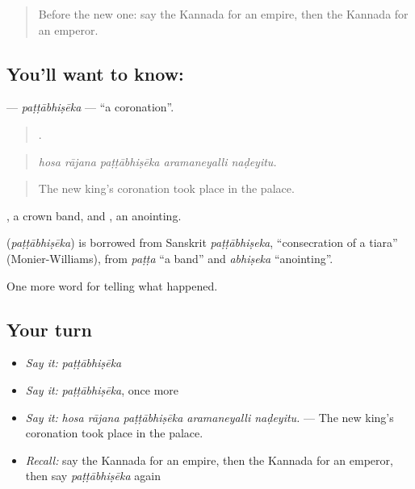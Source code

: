 \label{lesson:KA-C354-pattabhiseka}



\begin{quote}
Before the new one: say the Kannada for an empire, then the Kannada for an emperor.
\end{quote}

\subsection*{You'll want to know: }
\textbf{} — \emph{paṭṭābhiṣēka} — \textquotedblleft{}a coronation\textquotedblright{}.

\begin{quote}
    .
\end{quote}

\begin{quote}
\emph{hosa rājana paṭṭābhiṣēka aramaneyalli naḍeyitu.}
\end{quote}

\begin{quote}
The new king's coronation took place in the palace.
\end{quote}

, a crown band, and , an anointing.

\begin{cousinweb}
\textbf{} (\emph{paṭṭābhiṣēka}) is borrowed from Sanskrit \emph{paṭṭābhiṣeka}, \textquotedblleft{}consecration of a tiara\textquotedblright{} (Monier-Williams), from \emph{paṭṭa} \textquotedblleft{}a band\textquotedblright{} and \emph{abhiṣeka} \textquotedblleft{}anointing\textquotedblright{}.
\end{cousinweb}

\begin{grammarlens}[title={What you've built}]
One more word for telling what happened.
\end{grammarlens}

\subsection*{Your turn}
\begin{itemize}
\raggedright
  \item \emph{Say it:} \emph{paṭṭābhiṣēka}
  \item \emph{Say it:} \emph{paṭṭābhiṣēka}, once more
  \item \emph{Say it:} \emph{hosa rājana paṭṭābhiṣēka aramaneyalli naḍeyitu.} — The new king's coronation took place in the palace.
  \item \emph{Recall:} say the Kannada for an empire, then the Kannada for an emperor, then say \emph{paṭṭābhiṣēka} again
\end{itemize}

